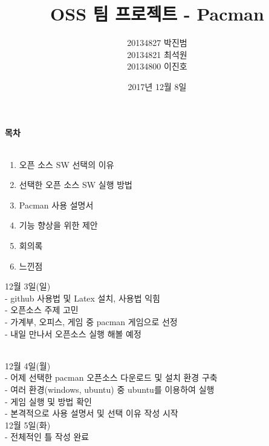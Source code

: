 \documentclass{article}
\begin{document}
\title{\textbf{OSS 팀 프로젝트 - Pacman}}
\author {20134827 박진범\\20134821 최석원\\20134800 이진호}
\date{2017년 12월 8일}
\maketitle


\newpage
\textbf{목차}\\\
\begin{enumerate}
\item 오픈 소스 SW 선택의 이유  \\
\item 선택한 오픈 소스 SW 실행 방법 \\
\item Pacman 사용 설명서 \\
\item 기능 향상을 위한 제안 \\
\item 회의록 \\
\item 느낀점
\end{enumerate}

\newpage
12월 3일(일)\\

- github 사용법 및 Latex 설치, 사용법 익힘\\

- 오픈소스 주제 고민\\

- 가계부, 오피스, 게임 중 pacman 게임으로 선정\\

- 내일 만나서 오픈소스 실행 해볼 예정\\\


12월 4일(월)\\

- 어제 선택한 pacman 오픈소스 다운로드 및 설치 환경 구축\\

- 여러 환경(windows, ubuntu) 중 ubuntu를 이용하여 실행\\

- 게임 실행 및 방법 확인\\

- 본격적으로 사용 설명서 및 선택 이유 작성 시작\\

12월 5일(화)\\

- 전체적인 틀 작성 완료\\
\end{document}
